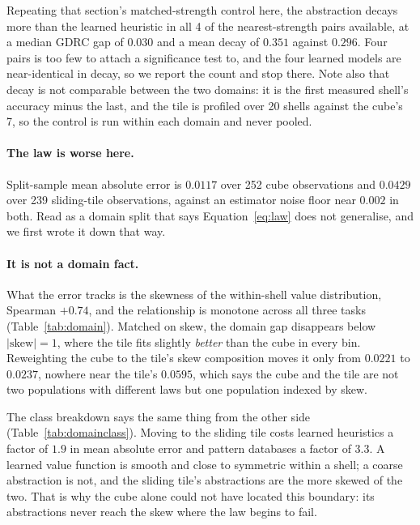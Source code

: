 Repeating that section's matched-strength control here, the abstraction decays
more than the learned heuristic in all 4 of the nearest-strength pairs available,
at a median GDRC gap of $0.030$ and a mean decay of $0.351$ against $0.296$. Four
pairs is too few to attach a significance test to, and the four learned models
are near-identical in decay, so we report the count and stop there. Note also
that decay is not comparable between the two domains: it is the first measured
shell's accuracy minus the last, and the tile is profiled over 20 shells against
the cube's 7, so the control is run within each domain and never pooled.

\paragraph{The law is worse here.} Split-sample mean absolute error is $0.0117$
over 252 cube observations and $0.0429$ over 239 sliding-tile observations,
against an estimator noise floor near $0.002$ in both. Read as a domain split
that says Equation~\ref{eq:law} does not generalise, and we first wrote it down
that way.

\paragraph{It is not a domain fact.} What the error tracks is the skewness of the
within-shell value distribution, Spearman $+0.74$, and the relationship is
monotone across all three tasks (Table~\ref{tab:domain}). Matched on skew, the
domain gap disappears below $|\mathrm{skew}| = 1$, where the tile fits slightly
\emph{better} than the cube in every bin. Reweighting the cube to the tile's skew
composition moves it only from $0.0221$ to $0.0237$, nowhere near the tile's
$0.0595$, which says the cube and the tile are not two populations with different
laws but one population indexed by skew.

\begin{table}[t]
\centering

\caption{The law's error tracks within-shell skewness rather than the state
space. Top: the three tasks in increasing order of median skew. Bottom: matched
on skew, the cube and the sliding tile agree below $|\mathrm{skew}| = 1$ and
diverge above it. Pattern databases only, so this reproduces without a trained
model.}
\label{tab:domain}
\end{table}

The class breakdown says the same thing from the other side
(Table~\ref{tab:domainclass}). Moving to the sliding tile costs learned
heuristics a factor of $1.9$ in mean absolute error and pattern databases a
factor of $3.3$. A learned value function is smooth and close to symmetric
within a shell; a coarse abstraction is not, and the sliding tile's abstractions
are the more skewed of the two. That is why the cube alone could not have
located this boundary: its abstractions never reach the skew where the law
begins to fail.

